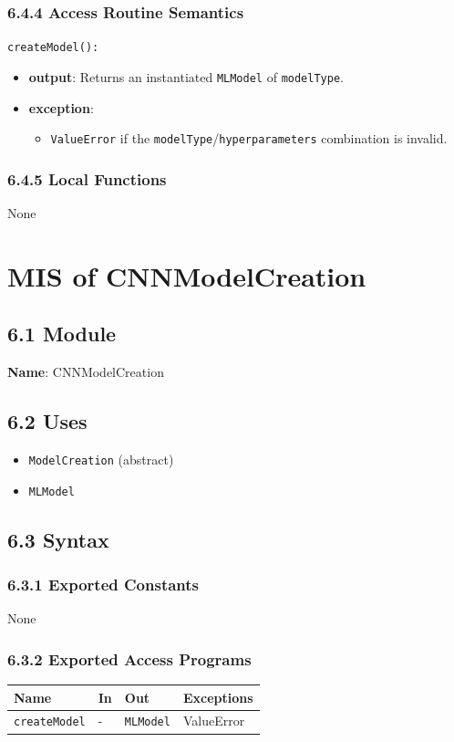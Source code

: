 \documentclass[12pt, titlepage]{article}
\begin{document}
\subsubsection{6.4.4 Access Routine Semantics}
\noindent \texttt{createModel():}
\begin{itemize}
    \item \textbf{output}: Returns an instantiated \texttt{MLModel} of \texttt{modelType}.
    \item \textbf{exception}:
    \begin{itemize}
        \item \texttt{ValueError} if the \texttt{modelType}/\texttt{hyperparameters} combination is invalid.
    \end{itemize}
\end{itemize}

\subsubsection{6.4.5 Local Functions}
None

\section{MIS of CNNModelCreation}
\label{sec:CNNModelCreation}

\subsection{6.1 Module}
\textbf{Name}: CNNModelCreation

\subsection{6.2 Uses}
\begin{itemize}
    \item \texttt{ModelCreation} (abstract)
    \item \texttt{MLModel}
\end{itemize}

\subsection{6.3 Syntax}

\subsubsection{6.3.1 Exported Constants}
None

\subsubsection{6.3.2 Exported Access Programs}
\begin{center}
\begin{tabular}{p{3.5cm} p{3cm} p{4cm} p{3cm}}
\hline
\textbf{Name} & \textbf{In} & \textbf{Out} & \textbf{Exceptions} \\
\hline
\texttt{createModel} & - & \texttt{MLModel} & ValueError \\
\hline
\end{tabular}
\end{center}
\end{document}
